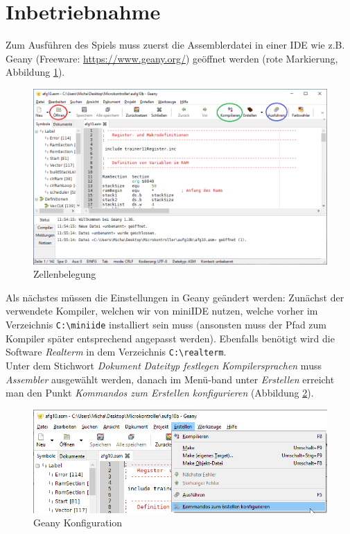 \section{Inbetriebnahme}
    Zum Ausführen des Spiels muss zuerst die Assemblerdatei in einer IDE wie z.B. Geany (Freeware: \url{https://www.geany.org/}) geöffnet werden (rote Markierung, Abbildung \ref{geany}).
    \begin{figure}[H]
        \centering
        \label{geany}
        \includegraphics[scale=0.5]{img/geany.png}    
        \caption{Zellenbelegung}
    \end{figure}
    Als nächstes müssen die Einstellungen in Geany geändert werden: 
    Zunächst der verwendete Kompiler, welchen wir von miniIDE nutzen, welche vorher im Verzeichnis \texttt{C:\textbackslash{}miniide} installiert sein muss (ansonsten muss der Pfad zum Kompiler später entsprechend angepasst werden).
    Ebenfalls benötigt wird die Software \textit{Realterm} in dem Verzeichnis \texttt{C:\textbackslash{}realterm}.
    \\
    Unter dem Stichwort \textit{Dokument} \textrightarrow{} \textit{Dateityp festlegen} \textrightarrow{} \textit{Kompilersprachen} muss \textit{Assembler} ausgewählt werden,
    danach im Menü-band unter \textit{Erstellen} erreicht man den Punkt \textit{Kommandos zum Erstellen konfigurieren} (Abbildung \ref{geany-menu}).
    \begin{figure}[H]
        \centering
        \label{geany-menu}
        \includegraphics[scale=0.5]{img/geany-menu.png}    
        \caption{Geany Konfiguration}
    \end{figure}
